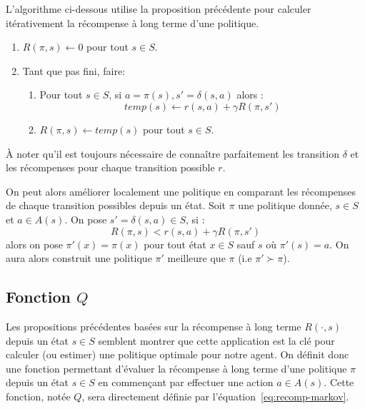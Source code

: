 L'algorithme ci-dessous utilise la proposition précédente pour calculer itérativement la récompense à long terme d'une politique. 

\begin{algorithm}[H]
\caption{Calcul de la récompense à long terme}
\begin{enumerate}
    \item $ R( \pi, s) \longleftarrow 0$ pour tout $s \in S$. 
    \item Tant que pas fini, faire: 
    \begin{enumerate}
        \item Pour tout $s \in S$, si $ a = \pi(s), s' = \delta(s, a)$ alors : 
            $$ temp(s) \longleftarrow r(s,a) + \gamma R( \pi, s')$$ 
        \item $R( \pi, s) \longleftarrow temp(s)$ pour tout $s \in S$. 
    \end{enumerate}
\end{enumerate}
\end{algorithm}

À noter qu'il est toujours nécessaire de connaître parfaitement les transition $ \delta$ et les récompenses pour chaque transition possible $ r$. 

\begin{proposition} \label{prop:policy-improving}
    On peut alors améliorer localement une politique en comparant les récompenses de chaque transition possibles depuis un état. Soit $ \pi$ une politique donnée, $ s \in S$ et $a \in A(s)$. On pose $ s' = \delta(s, a) \in S$, si : 
    \begin{equation}
        R( \pi, s) < r(s, a) + \gamma R( \pi, s')
    \end{equation}
    alors on pose $\pi'(x) = \pi(x)$ pour tout état $ x \in S$ sauf $s$ où $ \pi'(s) = a$. On aura alors construit une politique $ \pi'$ meilleure que $ \pi$ (i.e $ \pi' \succ \pi$). 
\end{proposition}

\subsection{Fonction $Q$}

Les propositions précédentes basées sur la récompense à long terme $ R(\cdot, s)$ depuis un état $s \in S$ semblent montrer que cette application est la clé pour calculer (ou estimer) une politique optimale pour notre agent. On définit donc une fonction permettant d'évaluer la récompense à long terme d'une politique $ \pi$ depuis un état $s \in S$ en commençant par effectuer une action $a \in A(s)$. Cette fonction, notée $Q$, sera directement définie par l'équation~\ref{eq:recomp-markov}. 

